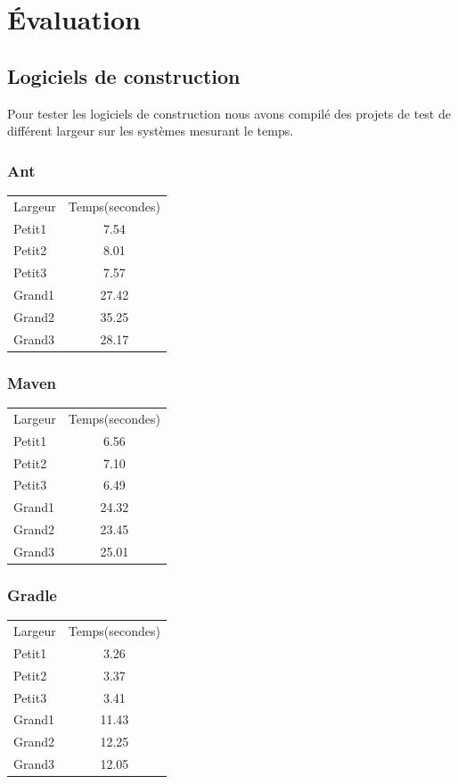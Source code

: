 \chapter{Évaluation}
\label{eval}

\section{Logiciels de construction}
Pour tester les logiciels de construction nous avons compilé des projets de test de différent largeur sur les systèmes mesurant le temps.
\subsection{Ant}
\begin{tabular}{l|c}
	Largeur&Temps(secondes)\\
		Petit1&7.54\\
		Petit2&8.01\\
		Petit3&7.57\\
		Grand1&27.42\\
		Grand2&35.25\\
		Grand3&28.17\\
\end{tabular}
\subsection{Maven}
\begin{tabular}{l|c}
	Largeur&Temps(secondes)\\
	Petit1&6.56\\
	Petit2&7.10\\
	Petit3&6.49\\
	Grand1&24.32\\
	Grand2&23.45\\
	Grand3&25.01\\
\end{tabular}
\subsection{Gradle}
\begin{tabular}{l|c}
	Largeur&Temps(secondes)\\
	Petit1&3.26\\
	Petit2&3.37\\
	Petit3&3.41\\
	Grand1&11.43\\
	Grand2&12.25\\
	Grand3&12.05\\
\end{tabular}

